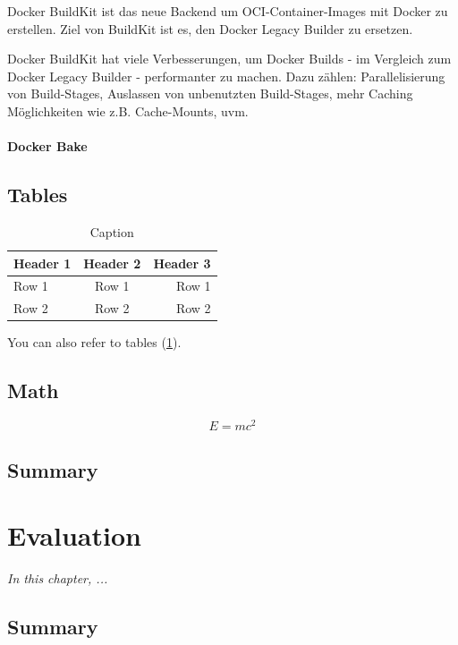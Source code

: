 \documentclass[
	12pt,
	a4paper,
	printlength,
	bibliography=totoc,
	chapterprefix,
	headings=openright,
	numbers=endperiod,
	parskip=half,
	twoside
 ]{scrreprt}
\begin{document}
Docker BuildKit ist das neue Backend um OCI-Container-Images mit Docker zu erstellen. Ziel von BuildKit ist es, den Docker Legacy Builder zu ersetzen. 

Docker BuildKit hat viele Verbesserungen, um Docker Builds - im Vergleich zum Docker Legacy Builder - performanter zu machen. Dazu zählen: Parallelisierung von Build-Stages, Auslassen von unbenutzten Build-Stages, mehr Caching Möglichkeiten wie z.B. Cache-Mounts, uvm.

\subsubsection{Docker Bake}

\section{Tables}

\begin{table}[ht]
	\centering
	\begin{tabular}{|l|c|r|}
		\hline
		\textbf{Header 1} & \textbf{Header 2} & \textbf{Header 3} \\
		\hline
		\hline
		Row 1 & Row 1 & Row 1 \\
		Row 2 & Row 2 & Row 2 \\
		\hline
	\end{tabular}
	\caption{Caption}
	\label{tab:table}
\end{table}

You can also refer to tables (\cref{tab:table}).

\section{Math}

\[
	E = m c^2
\]

\section*{Summary}

\lipsum[2]

\chapter{Evaluation}
\label{cha:evaluation}

\textit{In this chapter, ...}

\section*{Summary}
\end{document}

